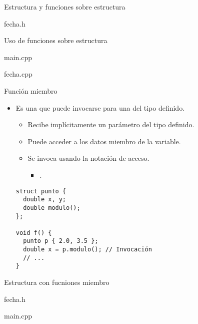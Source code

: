 \begin{frame}[t]{Estructura y funciones sobre estructura}
\begin{block}{fecha.h}

\end{block}
\end{frame}

\begin{frame}[t]{Uso de funciones sobre estructura}
\begin{block}{main.cpp}

\end{block}
\end{frame}

\begin{frame}
\begin{block}{fecha.cpp}
\mode<presentation>{

}
\end{block}
\end{frame}

\begin{frame}[fragile]{Función miembro}
\begin{itemize}
  \item Es una  que puede invocarse 
         para una  del tipo definido.
    \begin{itemize}
      \item Recibe implícitamente un parámetro del tipo definido.
      \item Puede acceder a los datos miembro de la variable.
      \item Se invoca usando la notación de acceso.
        \begin{itemize}
          \item {}.
        \end{itemize}
    \end{itemize}
\begin{lstlisting}
struct punto {
  double x, y;
  double modulo();
};

void f() {
  punto p { 2.0, 3.5 };
  double x = p.modulo(); // Invocación
  // ...
}
\end{lstlisting}
\end{itemize}
\end{frame}

\begin{frame}{Estructura con fucniones miembro}
\begin{block}{fecha.h}

\end{block}
\begin{block}{main.cpp}

\end{block}
\end{frame}

